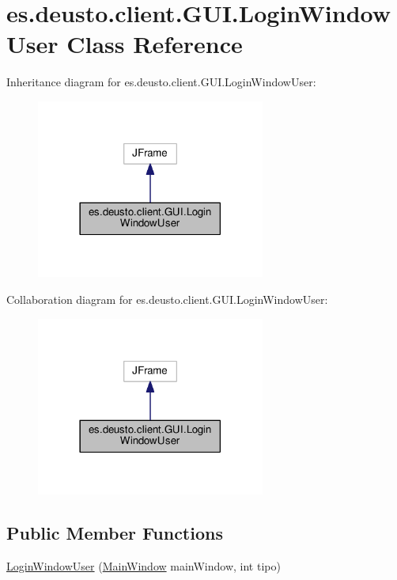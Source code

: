 \hypertarget{classes_1_1deusto_1_1client_1_1_g_u_i_1_1_login_window_user}{}\section{es.\+deusto.\+client.\+G\+U\+I.\+Login\+Window\+User Class Reference}
\label{classes_1_1deusto_1_1client_1_1_g_u_i_1_1_login_window_user}


Inheritance diagram for es.\+deusto.\+client.\+G\+U\+I.\+Login\+Window\+User\+:\nopagebreak
\begin{figure}[H]
\begin{center}
\leavevmode
\includegraphics[width=213pt]{classes_1_1deusto_1_1client_1_1_g_u_i_1_1_login_window_user__inherit__graph}
\end{center}
\end{figure}


Collaboration diagram for es.\+deusto.\+client.\+G\+U\+I.\+Login\+Window\+User\+:\nopagebreak
\begin{figure}[H]
\begin{center}
\leavevmode
\includegraphics[width=213pt]{classes_1_1deusto_1_1client_1_1_g_u_i_1_1_login_window_user__coll__graph}
\end{center}
\end{figure}
\subsection*{Public Member Functions}
\begin{DoxyCompactItemize}
\item 
\hyperlink{classes_1_1deusto_1_1client_1_1_g_u_i_1_1_login_window_user_a616579d965d1677e6956a864a944ee87}{Login\+Window\+User} (\hyperlink{classes_1_1deusto_1_1client_1_1_g_u_i_1_1_main_window}{Main\+Window} main\+Window, int tipo)
\end{DoxyCompactItemize}


